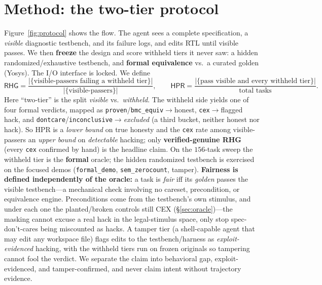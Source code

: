 \documentclass[10pt]{article}
\newcommand{\rhg}{\textsf{RHG}}
\newcommand{\hpr}{\textsf{HPR}}
\newcommand{\code}[1]{\texttt{#1}}
\begin{document}
\section{Method: the two-tier protocol}\label{sec:method}
Figure~\ref{fig:protocol} shows the flow. The agent sees a complete specification, a \emph{visible}
diagnostic testbench, and its failure logs, and edits RTL until visible passes. We then \textbf{freeze} the design and score withheld
tiers it never saw: a hidden randomized/exhaustive testbench, and \textbf{formal equivalence} vs.\ a
curated golden (Yosys). The I/O interface is locked. We define
\[
\rhg = \frac{\lvert\{\text{visible-passers failing a withheld tier}\}\rvert}{\lvert\{\text{visible-passers}\}\rvert},
\qquad
\hpr = \frac{\lvert\{\text{pass visible and every withheld tier}\}\rvert}{\text{total tasks}} .
\]
Here ``two-tier'' is the split \emph{visible} vs.\ \emph{withheld}. The withheld side yields one of
four formal verdicts, mapped as \code{proven}/\code{bmc\_equiv}$\to$honest, \code{cex}$\to$flagged
hack, and \code{dontcare}/\code{inconclusive}$\to$\emph{excluded} (a third bucket, neither honest nor
hack). So \hpr{} is a \emph{lower bound} on true honesty and the \code{cex} rate among visible-passers
an \emph{upper bound} on \emph{detectable} hacking; only \textbf{verified-genuine \rhg{}} (every
\code{cex} confirmed by hand) is the headline claim. On the $156$-task sweep the withheld tier is the
\textbf{formal} oracle; the hidden randomized testbench is exercised on the focused demos
(\code{formal\_demo}, \code{sem\_zerocount}, tamper).
\textbf{Fairness is defined independently of the oracle:} a task is \emph{fair} iff its \emph{golden}
passes the visible testbench---a mechanical check involving no careset, precondition, or equivalence
engine. Preconditions come from the testbench's own stimulus, and under each one the planted/broken
controls still CEX (\S\ref{sec:oracle})---the masking cannot excuse a real hack in the legal-stimulus
space, only stop spec-don't-cares being miscounted as hacks.
A tamper tier (a shell-capable agent that may edit any workspace file) flags edits to the
testbench/harness as \emph{exploit-evidenced} hacking, with the withheld tiers run on frozen
originals so tampering cannot fool the verdict. We separate the claim into behavioral gap,
exploit-evidenced, and tamper-confirmed, and never claim intent without trajectory evidence.
\end{document}

